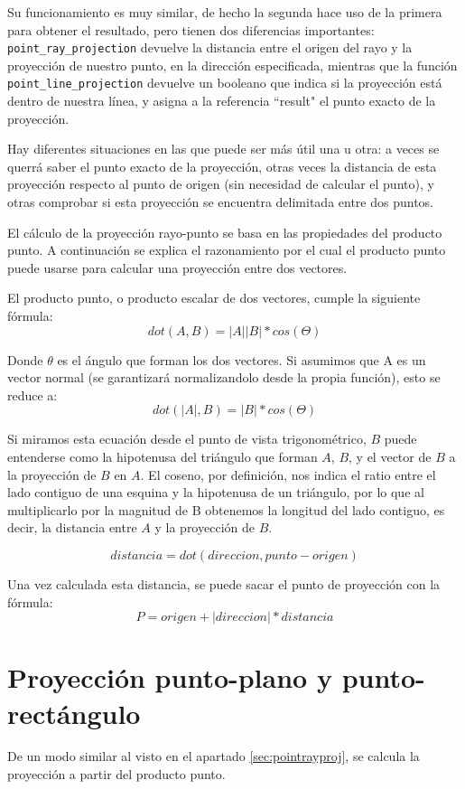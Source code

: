 Su funcionamiento es muy similar, de hecho la segunda hace uso de la primera para obtener el resultado, pero tienen dos diferencias importantes: \texttt{point\_ray\_projection} devuelve la distancia entre el origen del rayo y la proyección de nuestro punto, en la dirección especificada, mientras que la función \texttt{point\_line\_projection} devuelve un booleano que indica si la proyección está dentro de nuestra línea, y asigna a la referencia ``result" el punto exacto de la proyección.

Hay diferentes situaciones en las que puede ser más útil una u otra: a veces se querrá saber el punto exacto de la proyección, otras veces la distancia de esta proyección respecto al punto de origen (sin necesidad de calcular el punto), y otras comprobar si esta proyección se encuentra delimitada entre dos puntos.

El cálculo de la proyección rayo-punto se basa en las propiedades del producto punto. A continuación se explica el razonamiento por el cual el producto punto puede usarse para calcular una proyección entre dos vectores.

El producto punto, o producto escalar de dos vectores, cumple la siguiente fórmula:
\[ dot(A,B) = |A||B|*cos(\Theta) \]

Donde $\theta$ es el ángulo que forman los dos vectores. Si asumimos que A es un vector normal (se garantizará normalizandolo desde la propia función), esto se reduce a:
\[ dot(|A|,B) = |B|*cos(\Theta) \]

Si miramos esta ecuación desde el punto de vista trigonométrico, $B$ puede entenderse como la hipotenusa del triángulo que forman $A$, $B$, y el vector de $B$ a la proyección de $B$ en $A$. El coseno, por definición, nos indica el ratio entre el lado contiguo de una esquina y la hipotenusa de un triángulo, por lo que al multiplicarlo por la magnitud de B obtenemos la longitud del lado contiguo, es decir, la distancia entre $A$ y la proyección de $B$.

\[ distancia = dot(direccion, punto - origen) \]

Una vez calculada esta distancia, se puede sacar el punto de proyección con la fórmula:
\[ P = origen + |direccion| * distancia \]

\section{Proyección punto-plano y punto-rectángulo}
\label{sec:pointplaneproj}
De un modo similar al visto en el apartado \ref{sec:pointrayproj}, se calcula la proyección a partir del producto punto.

